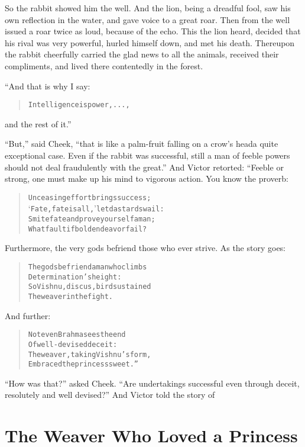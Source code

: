 \documentclass[article, twoside, 10pt]{memoir}
\renewenvironment{verbatim}{%
\begin{quote}%
\vskip -10pt%
\begin{alltt}\normalfont\small}{\end{alltt}%
\end{quote}%
\vskip -10pt
} %
\begin{document}
So the rabbit showed him the well. And the lion, being a dreadful
fool, saw his own reflection in the water, and gave voice to a
great roar. Then from the well issued a roar twice as loud, because
of the echo. This the lion heard, decided that his rival was very
powerful, hurled himself down, and met his death. Thereupon the
rabbit cheerfully carried the glad news to all the animals,
received their compliments, and lived there contentedly in the
forest.

“And that is why I say:

\begin{verbatim}
Intelligence is power, ...,
\end{verbatim}
and the rest of it.”

``But,'' said Cheek,
``that is like a palm-fruit falling on a crow's head{\textemdash}a quite exceptional case. Even if the rabbit was successful, still a man of feeble powers should not deal fraudulently with the great.''
And Victor retorted: “Feeble or strong, one must make up his mind
to vigorous action. You know the proverb:

\begin{verbatim}
Unceasing effort brings success;
    ‘Fate, fate is all,’ let dastards wail:
Smite fate and prove yourself a man;
    What fault if bold endeavor fail?
\end{verbatim}
Furthermore, the very gods befriend those who ever strive. As the
story goes:

\begin{verbatim}
The gods befriend a man who climbs
    Determination's height:
So Vishnu, discus, bird sustained
    The weaver in the fight.
\end{verbatim}
And further:

\begin{verbatim}
Not even Brahma sees the end
    Of well-devised deceit:
The weaver, taking Vishnu's form,
    Embraced the princess sweet.”
\end{verbatim}
``How was that?'' asked Cheek.
``Are undertakings successful even through deceit, resolutely and well devised?''
And Victor told the story of

\chapter{The Weaver Who Loved a Princess}
\end{document}
